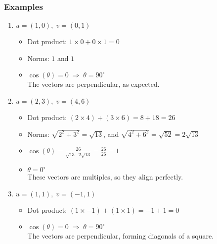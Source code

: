 \documentclass[
  letterpaper,
  DIV=11,
  numbers=noendperiod]{scrreprt}
\providecommand{\tightlist}{%
  \setlength{\itemsep}{0pt}\setlength{\parskip}{0pt}}
\begin{document}
\subsubsection{Examples}\label{examples-1}

\begin{enumerate}
\def\labelenumi{\arabic{enumi}.}
\item
  \(u = (1, 0), \; v = (0, 1)\)

  \begin{itemize}
  \tightlist
  \item
    Dot product: \(1 \times 0 + 0 \times 1 = 0\)\\
  \item
    Norms: \(1\) and \(1\)\\
  \item
    \(\cos(\theta) = 0 \;\Rightarrow\; \theta = 90^\circ\)\\
    The vectors are perpendicular, as expected.
  \end{itemize}
\item
  \(u = (2, 3), \; v = (4, 6)\)

  \begin{itemize}
  \tightlist
  \item
    Dot product: \((2 \times 4) + (3 \times 6) = 8 + 18 = 26\)\\
  \item
    Norms: \(\sqrt{2^2 + 3^2} = \sqrt{13}\), and
    \(\sqrt{4^2 + 6^2} = \sqrt{52} = 2\sqrt{13}\)\\
  \item
    \(\cos(\theta) = \tfrac{26}{\sqrt{13} \cdot 2\sqrt{13}} = \tfrac{26}{26} = 1\)\\
  \item
    \(\theta = 0^\circ\)\\
    These vectors are multiples, so they align perfectly.
  \end{itemize}
\item
  \(u = (1, 1), \; v = (-1, 1)\)

  \begin{itemize}
  \tightlist
  \item
    Dot product: \((1 \times -1) + (1 \times 1) = -1 + 1 = 0\)\\
  \item
    \(\cos(\theta) = 0 \;\Rightarrow\; \theta = 90^\circ\)\\
    The vectors are perpendicular, forming diagonals of a square.
  \end{itemize}
\end{enumerate}
\end{document}
